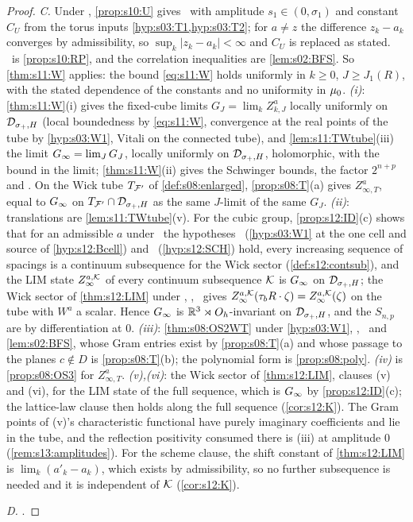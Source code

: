 \begin{proof}
\emph{C.} Under \Tthree, \cref{prop:s10:U} gives \Itwo\ with amplitude $s_1\in(0,\sigma_1)$ and constant $C_U$ from the torus inputs \cref{hyp:s03:T1,hyp:s03:T2}; for $a\ne z$ the difference $z_k-a_k$ converges by admissibility, so $\sup_k|z_k-a_k|<\infty$ and $C_U$ is replaced as stated. \Ithree\ is \cref{prop:s10:RP}, and the correlation inequalities are \cref{lem:s02:BFS}. So \cref{thm:s11:W} applies: the bound \eqref{eq:s11:W} holds uniformly in $k\ge0$, $J\ge J_1(R)$, with the stated dependence of the constants and no uniformity in $\mu_0$. \emph{(i)}: \cref{thm:s11:W}(i) gives the fixed-cube limits $G_J=\lim_kZ^a_{k,J}$ locally uniformly on $\mathcal D_{\sigma_+,H}$ (local boundedness by \eqref{eq:s11:W}, convergence at the real points of the tube by \cref{hyp:s03:W1}, Vitali on the connected tube), and \cref{lem:s11:TWtube}(iii) the limit $G_\infty=\lim_JG_J$, locally uniformly on $\mathcal D_{\sigma_+,H}$, holomorphic, with the bound in the limit; \cref{thm:s11:W}(ii) gives the Schwinger bounds, the factor $2^{n+p}$ and \Ezz. On the Wick tube $T_{\mathcal F'}$ of \cref{def:s08:enlarged}, \cref{prop:s08:T}(a) gives $Z^a_{\infty,T}$, equal to $G_\infty$ on $T_{\mathcal F'}\cap\mathcal D_{\sigma_+,H}$ as the same $J$-limit of the same $G_J$. \emph{(ii)}: translations are \cref{lem:s11:TWtube}(v). For the cubic group, \cref{prop:s12:ID}(c) shows that for an admissible $a$ under \Tthree\ the hypotheses \Bcell\ (\cref{hyp:s03:W1} at the one cell and source of \cref{hyp:s12:Bcell}) and \SCH\ (\cref{hyp:s12:SCH}) hold, every increasing sequence of spacings is a continuum subsequence for the Wick sector (\cref{def:s12:contsub}), and the LIM state $Z^{a,\mathcal K}_\infty$ of every continuum subsequence $\mathcal K$ is $G_\infty$ on $\mathcal D_{\sigma_+,H}$; the Wick sector of \cref{thm:s12:LIM} under \Tthree, \Bcell, \SCH\ gives $Z^{a,\mathcal K}_\infty(\tau_bR\cdot\zeta)=Z^{a,\mathcal K}_\infty(\zeta)$ on the tube with $W^a$ a scalar. Hence $G_\infty$ is $\mathbb R^3\rtimes O_h$-invariant on $\mathcal D_{\sigma_+,H}$, and the $S_{n,p}$ are by differentiation at $0$. \emph{(iii)}: \cref{thm:s08:OS2WT} under \cref{hyp:s03:W1}, \Itwo, \Ithree\ and \cref{lem:s02:BFS}, whose Gram entries exist by \cref{prop:s08:T}(a) and whose passage to the planes $c\notin D$ is \cref{prop:s08:T}(b); the polynomial form is \cref{prop:s08:poly}. \emph{(iv)} is \cref{prop:s08:OS3} for $Z^a_{\infty,T}$. \emph{(v),(vi)}: the Wick sector of \cref{thm:s12:LIM}, clauses (v) and (vi), for the LIM state of the full sequence, which is $G_\infty$ by \cref{prop:s12:ID}(c); the lattice-law clause then holds along the full sequence (\cref{cor:s12:K}). The Gram points of (v)'s characteristic functional have purely imaginary coefficients and lie in the tube, and the reflection positivity consumed there is (iii) at amplitude $0$ (\cref{rem:s13:amplitudes}). For the scheme clause, the shift constant of \cref{thm:s12:LIM} is $\lim_k(a'_k-a_k)$, which exists by admissibility, so no further subsequence is needed and it is independent of $\mathcal K$ (\cref{cor:s12:K}).

\emph{D.} .
\end{proof}

